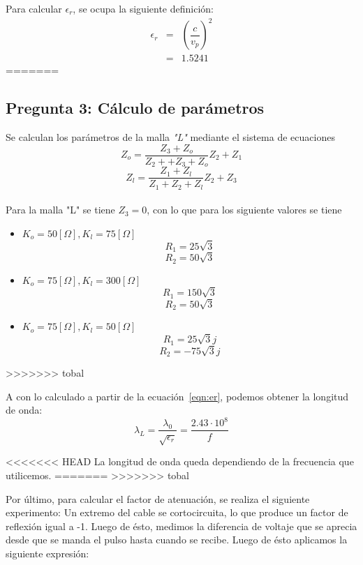 \documentclass[11pt,onecolumn]{article}
\begin{document}
Para calcular $\epsilon_{r}$, se ocupa la siguiente definición:
\begin{eqnarray}
\epsilon_{r} & = & \left(\dfrac{c}{v_{p}}\right)^{2}\nonumber \\
			 & = & 1.5241\label{eqn:er}
\end{eqnarray}
=======


\subsection*{Pregunta 3: Cálculo de parámetros}

Se calculan los parámetros de la malla \textit{"L"} mediante el sistema de ecuaciones
\\
	$$Z_o = \frac{Z_3+Z_o}{Z_2++Z_3+Z_o}Z_2 + Z_1$$
	$$Z_l = \frac{Z_1+Z_l}{Z_1+Z_2+Z_l}Z_2 + Z_3$$
\\
Para la malla "L" se tiene $Z_3 = 0$, con lo que para los siguiente valores se tiene\\

	\begin{itemize}
	\item $K_o = 50[\Omega], K_l = 75[\Omega]$
			$$ R_1 = 25\sqrt{3} $$
			$$ R_2 = 50\sqrt{3} $$
	\item $K_o = 75[\Omega], K_l = 300[\Omega]$
			$$ R_1 = 150\sqrt{3} $$
			$$ R_2 = 50\sqrt{3} $$
	\item $K_o = 75[\Omega], K_l = 50[\Omega]$
			$$ R_1 = 25\sqrt{3}j $$
			$$ R_2 = -75\sqrt{3}j $$
	\end{itemize}
>>>>>>> tobal

A con lo calculado a partir de la ecuación~\ref{eqn:er}, podemos obtener la longitud de onda:
\begin{equation}
\lambda_{L} = \dfrac{\lambda_{0}}{\sqrt{\epsilon_{r}}} = \dfrac{2.43\cdot 10^{8}}{f}
\end{equation}

<<<<<<< HEAD
La longitud de onda queda dependiendo de la frecuencia que utilicemos. 
=======
>>>>>>> tobal

Por último, para calcular el factor de atenuación, se realiza el siguiente experimento: Un extremo del cable se cortocircuita, lo que produce un factor de reflexión igual a -1. Luego de ésto, medimos la diferencia de voltaje que se aprecia desde que se manda el pulso hasta cuando se recibe. Luego de ésto aplicamos la siguiente expresión:
\end{document}
